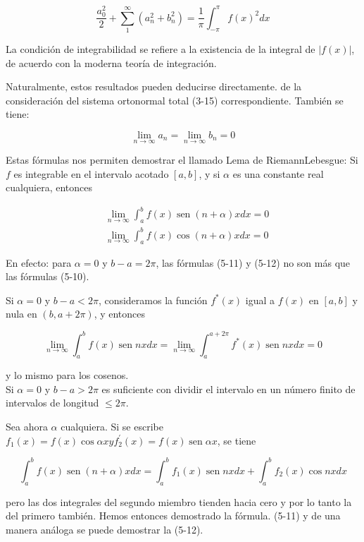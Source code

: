 \documentclass[10pt]{article}
\theoremstyle{plain}
\theoremstyle{definition}
\theoremstyle{remark}
\begin{document}
$$
\frac{a_{0}^{2}}{2}+\sum_{1}^{\infty}\left(a_{n}^{2}+b_{n}^{2}\right)=\frac{1}{\pi} \int_{-\pi}^{\pi} f(x)^{2} d x
$$

La condición de integrabilidad se refiere a la existencia de la integral de $|f(x)|$, de acuerdo con la moderna teoría de integración.

Naturalmente, estos resultados pueden deducirse directamente. de la consideración del sistema ortonormal total (3-15) correspondiente. También se tiene:


\begin{equation*}
\lim _{n \rightarrow \infty} a_{n}=\lim _{n \rightarrow \infty} b_{n}=0 \tag{5-10}
\end{equation*}


Estas fórmulas nos permiten demostrar el llamado Lema de RiemannLebesgue: Si $f$ es integrable en el intervalo acotado $[a, b]$, y si $\alpha$ es una constante real cualquiera, entonces


\begin{align*}
& \lim _{n \rightarrow \infty} \int_{a}^{b} f(x) \operatorname{sen}(n+\alpha) x d x=0  \tag{5-11}\\
& \lim _{n \rightarrow \infty} \int_{a}^{b} f(x) \cos (n+\alpha) x d x=0 \tag{5-12}
\end{align*}


En efecto: para $\alpha=0$ y $b-a=2 \pi$, las fórmulas (5-11) y (5-12) no son más que las fórmulas (5-10).

Si $\alpha=0$ y $b-a<2 \pi$, consideramos la función $f^{*}(x)$ igual a $f(x)$ en $[a, b]$ y nula en $(b, a+2 \pi)$, y entonces

$$
\lim _{n \rightarrow \infty} \int_{a}^{b} f(x) \operatorname{sen} n x d x=\lim _{n \rightarrow \infty} \int_{a}^{a+2 \pi} f^{*}(x) \operatorname{sen} n x d x=0
$$

y lo mismo para los cosenos.\\
Si $\alpha=0$ y $b-a>2 \pi$ es suficiente con dividir el intervalo en un número finito de intervalos de longitud $\leqslant 2 \pi$.

Sea ahora $\alpha$ cualquiera. Si se escribe $f_{1}(x)=f(x) \cos \alpha x y f_{2}^{\prime}(x)=f(x) \operatorname{sen} \alpha x$, se tiene

$$
\int_{a}^{b} f(x) \operatorname{sen}(n+\alpha) x d x=\int_{a}^{b} f_{1}(x) \operatorname{sen} n x d x+\int_{a}^{b} f_{2}(x) \cos n x d x
$$

pero las dos integrales del segundo miembro tienden hacia cero y por lo tanto la del primero también. Hemos entonces demostrado la fórmula. (5-11) y de una manera análoga se puede demostrar la (5-12).
\end{document}
